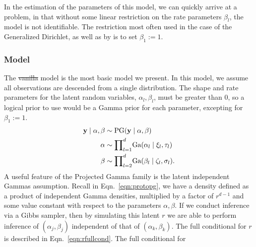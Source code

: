 In the estimation of the parameters of this model, we can quickly arrive at a problem, in that
  without some linear restriction on the rate parameters $\beta_l$, the model is not identifiable.
  The restriction most often used in the case of the Generalized Dirichlet, as well as by
  \cite{nunez2019} is to set $\beta_1 := 1$.

\subsubsection{  Model}
The \st{vanilla}  model is the most basic model we present.
  In this model, we assume all observations
  are descended from a single distribution.  The shape and rate parameters for the latent
   random variables, $\alpha_l,\beta_l$, must be greater than 0, so a logical prior to
  use would be a Gamma prior for each parameter, excepting for $\beta_1 := 1$.
  \begin{equation}
    \label{eqn:vanillap}
    \begin{aligned}
      {\bf y}\mid\alpha,\beta &\sim \text{PG}({\bf y}\mid\alpha,\beta)\\
      {\bf \alpha} &\sim {\small \prod}_{l = 1}^d \text{Ga}(\alpha_l \mid \xi_l,\tau_l)\\
      {\bf \beta} &\sim {\small \prod}_{l = 2}^d \text{Ga}(\beta_l\mid \zeta_l,\sigma_l).
    \end{aligned}
  \end{equation}
  A useful feature of the Projected Gamma family is the latent independent Gammas assumption.  Recall
  in Eqn.~\ref{eqn:protopg}, we have a density defined as a product of independent Gamma densities,
  multiplied by a factor of $r^{d-1}$ and some value constant with respect to the parameters
  $\alpha,\beta$.  If we conduct inference via a Gibbs sampler, then by simulating this latent $r$
  we are able to perform inference of $(\alpha_j,\beta_j)$ independent of that of $(\alpha_k,\beta_k)$.
  The full conditional for $r$ is described in Eqn.~\ref{eqn:rfullcond}.  The full conditional for
